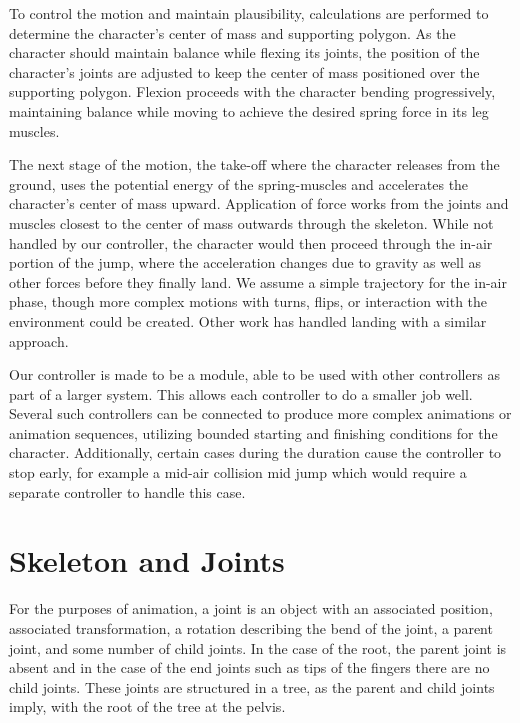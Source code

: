 To control the motion and maintain plausibility, calculations are performed to determine the character's center of mass and supporting polygon.  As the character should maintain balance while flexing its joints, the position of the character's joints are adjusted to keep the center of mass positioned over the supporting polygon.  Flexion proceeds with the character bending progressively, maintaining balance while moving to achieve the desired spring force in its leg muscles.

The next stage of the motion, the take-off where the character releases from the ground, uses the potential energy of the spring-muscles and accelerates the character's center of mass upward.  Application of force works from the joints and muscles closest to the center of mass outwards through the skeleton.  While not handled by our controller, the character would then proceed through the in-air portion of the jump, where the acceleration changes due to gravity as well as other forces before they finally land.  We assume a simple trajectory for the in-air phase, though more complex motions with turns, flips, or interaction with the environment could be created.  Other work has handled landing with a similar approach. \cite{falling_landing}

Our controller is made to be a module, able to be used with other controllers as part of a larger system.  This allows each controller to do a smaller job well. Several such controllers can be connected to produce more complex animations or animation sequences, utilizing bounded starting and finishing conditions for the character. Additionally, certain cases during the duration cause the controller to stop early, for example a mid-air collision mid jump which would require a separate controller to handle this case. \cite{composable_controllers}


\section{Skeleton and Joints}
For the purposes of animation, a joint is an object with an associated position, associated transformation, a rotation describing the bend of the joint, a parent joint, and some number of child joints.  In the case of the root, the parent joint is absent and in the case of the end joints such as tips of the fingers there are no child joints.  These joints are structured in a tree, as the parent and child joints imply, with the root of the tree at the pelvis.

